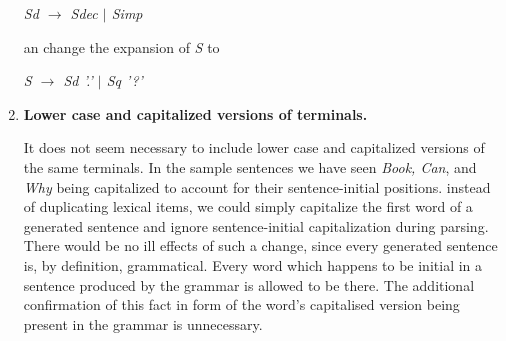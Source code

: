 \documentclass{article}
\begin{document}
\begin{enumerate}
\begin{center}
			\emph{Sd $\rightarrow$ Sdec $\vert$ Simp}
			
		\end{center}an change the expansion of \emph{S} to
		\begin{center}
			
			\emph{S $\rightarrow$ Sd '.' $\vert$ Sq '?'}
			
		\end{center}
		
		\item
		\textbf{Lower case and capitalized versions of terminals.}
		
		It does not seem necessary to include lower case and capitalized versions of the same terminals. In the sample sentences we have seen \textit{Book, Can}, and \textit{Why} being capitalized to account for their sentence-initial positions. instead of duplicating lexical items, we could simply capitalize  the first word of a generated sentence and ignore sentence-initial capitalization during parsing.
		There would be no ill effects of such a change, since every generated sentence is, by definition, grammatical. Every word which happens to be initial in a sentence produced by the grammar is allowed to be there. The additional confirmation of this fact in form of the word's capitalised version being present in the grammar is unnecessary.
		\end{enumerate}
\end{document}
